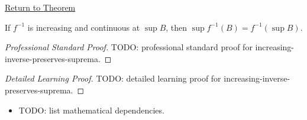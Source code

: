 \newpage
{}
\label{prf:increasing-inverse-preserves-suprema}

\begin{remark*}[Return]
\hyperref[thm:increasing-inverse-preserves-suprema]{Return to Theorem}
\end{remark*}

\begin{theorem*}
If $f^{-1}$ is increasing and continuous at $\sup B$, then
$\sup f^{-1}(B)=f^{-1}(\sup B)$.
\end{theorem*}

\begin{proof}[Professional Standard Proof]
\LRAProofBodyStart
TODO: professional standard proof for increasing-inverse-preserves-suprema.
\end{proof}

\begin{proof}[Detailed Learning Proof]
\LRAProofBodyStart
TODO: detailed learning proof for increasing-inverse-preserves-suprema.
\end{proof}

\begin{remark*}
\end{remark*}

\begin{dependencies}
\begin{itemize}
  \item TODO: list mathematical dependencies.
\end{itemize}
\end{dependencies}

\clearpage
